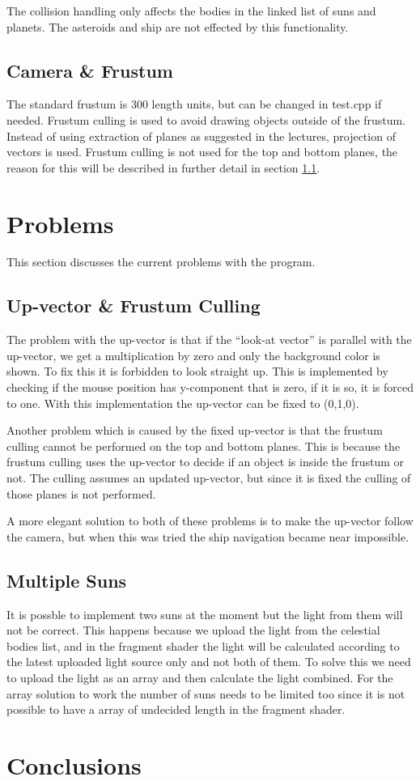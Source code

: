 \documentclass[a4paper,12pt]{article} \usepackage{graphicx}
\begin{document}
The collision handling only affects the bodies in the linked list of suns and
planets. The asteroids and ship are not effected by this functionality.

\subsection{Camera \& Frustum}
The standard frustum is 300 length units, but can be changed in test.cpp if
needed. Frustum culling is used to avoid drawing objects outside of the
frustum. Instead of using extraction of planes as suggested in the lectures,
projection of vectors is used. Frustum culling is not used for the top and
bottom planes, the reason for this will be described in further detail in
section \ref{sec:up_prob}.


\section{Problems}
This section discusses the current problems with the program.
\subsection{Up-vector \& Frustum Culling}
\label{sec:up_prob}
The problem with the up-vector is that if the ``look-at vector'' is parallel
with the up-vector, we get a multiplication by zero and  only the background
color is shown. To fix this it is forbidden to look straight up. This is
implemented by checking if the mouse position has y-component that is zero, if
it is so, it is forced to one. With this implementation the up-vector can be
fixed to (0,1,0). 


Another problem which is caused by the fixed up-vector is that the
frustum culling cannot be performed on the top and bottom planes. This is
because the frustum culling uses the up-vector to decide if an object is inside
the frustum or not. The culling assumes an updated up-vector, but since it is
fixed the culling of those planes is not performed.


A more elegant solution to both of these problems is to make the up-vector
follow the camera, but when this was tried the ship navigation became near
impossible.
\subsection{Multiple Suns}
It is possble to implement two suns at the moment but the light from them will
not be correct. This happens because we upload the light from the celestial
bodies list, and in the fragment shader the light will be calculated according
to the latest uploaded light source only and not both of them. To solve this we
need to upload the light as an array and then calculate the light combined. For
the array solution to work the number of suns needs to be limited too since it
is not possible to have a array of undecided length in the fragment shader.
\section{Conclusions}
\end{document}
